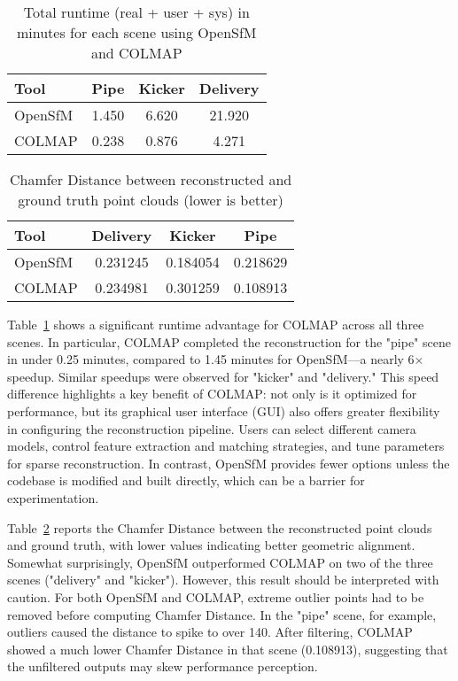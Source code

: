 \documentclass[10pt,twocolumn]{article}
\begin{document}
\begin{table}[h]
\centering
\begin{tabular}{lccc}
\toprule
\textbf{Tool} & \textbf{Pipe} & \textbf{Kicker} & \textbf{Delivery} \\
\midrule
OpenSfM & 1.450 & 6.620 & 21.920 \\
COLMAP  & 0.238 & 0.876 & 4.271 \\
\bottomrule
\end{tabular}
\caption{Total runtime (real + user + sys) in minutes for each scene using OpenSfM and COLMAP}
\label{tab:runtime_comparison}
\end{table}

\begin{table}[h]
\centering
\begin{tabular}{lccc}
\toprule
\textbf{Tool} & \textbf{Delivery} & \textbf{Kicker} & \textbf{Pipe} \\
\midrule
OpenSfM & 0.231245 & 0.184054 & 0.218629 \\
COLMAP  & 0.234981 & 0.301259 & 0.108913 \\
\bottomrule
\end{tabular}
\caption{Chamfer Distance between reconstructed and ground truth point clouds (lower is better)}
\label{tab:chamfer_distance_comparison}
\end{table}

Table~\ref{tab:runtime_comparison} shows a significant runtime advantage for COLMAP across all three scenes. In particular, COLMAP completed the reconstruction for the "pipe" scene in under 0.25 minutes, compared to 1.45 minutes for OpenSfM—a nearly 6× speedup. Similar speedups were observed for "kicker" and "delivery." This speed difference highlights a key benefit of COLMAP: not only is it optimized for performance, but its graphical user interface (GUI) also offers greater flexibility in configuring the reconstruction pipeline. Users can select different camera models, control feature extraction and matching strategies, and tune parameters for sparse reconstruction. In contrast, OpenSfM provides fewer options unless the codebase is modified and built directly, which can be a barrier for experimentation.

Table~\ref{tab:chamfer_distance_comparison} reports the Chamfer Distance between the reconstructed point clouds and ground truth, with lower values indicating better geometric alignment. Somewhat surprisingly, OpenSfM outperformed COLMAP on two of the three scenes ("delivery" and "kicker"). However, this result should be interpreted with caution. For both OpenSfM and COLMAP, extreme outlier points had to be removed before computing Chamfer Distance. In the "pipe" scene, for example, outliers caused the distance to spike to over 140. After filtering, COLMAP showed a much lower Chamfer Distance in that scene (0.108913), suggesting that the unfiltered outputs may skew performance perception.
\end{document}
